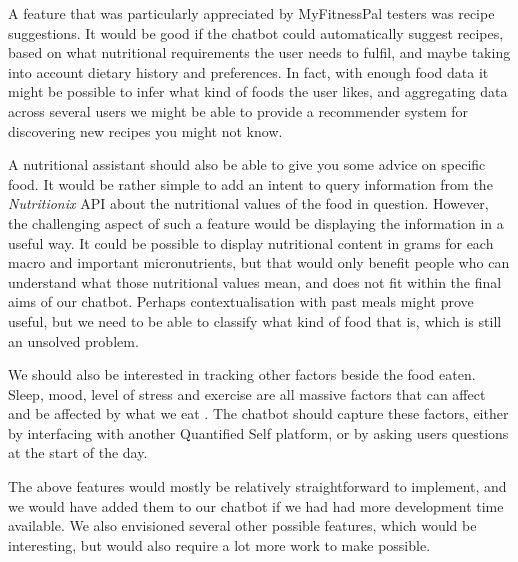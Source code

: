 A feature that was particularly appreciated by MyFitnessPal testers was recipe suggestions. It would be good if the chatbot could automatically suggest recipes, based on what nutritional requirements the user needs to fulfil, and maybe taking into account dietary history and preferences. In fact, with enough food data it might be possible to infer what kind of foods the user likes, and aggregating data across several users we might be able to provide a recommender system for discovering new recipes you might not know. 

A nutritional assistant should also be able to give you some advice on specific food. It would be rather simple to add an intent to query information from the \textit{Nutritionix} API about the nutritional values of the food in question. However, the challenging aspect of such a feature would be displaying the information in a useful way. It could be possible to display nutritional content in grams for each macro and important micronutrients, but that would only benefit people who can understand what those nutritional values mean, and does not fit within the final aims of our chatbot. Perhaps contextualisation with past meals might prove useful, but we need to be able to classify what kind of food that is, which is still an unsolved problem.

We should also be interested in tracking other factors beside the food eaten. Sleep, mood, level of stress and exercise are all massive factors that can affect and be affected by what we eat \cite{buman2015physical}. The chatbot should capture these factors, either by interfacing with another Quantified Self platform, or by asking users questions at the start of the day. 

The above features would mostly be relatively straightforward to implement, and we would have added them to our chatbot if we had had more development time available. We also envisioned several other possible features, which would be interesting, but would also require a lot more work to make possible.

